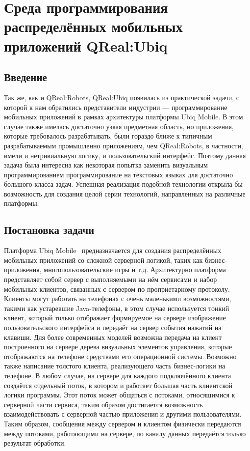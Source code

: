 \section{Среда программирования распределённых мобильных приложений QReal:Ubiq}
\label{chapter:qRealUbiq}

\subsection{Введение}
Так же, как и QReal:Robots, QReal:Ubiq появилась из практической задачи, с которой к нам 
обратились представители индустрии --- программирование мобильных приложений в рамках архитектуры 
платформы Ubiq Mobile. В этом случае также имелась достаточно узкая предметная область, 
но приложения, которые требовалось разрабатывать, были гораздо ближе к типичным разрабатываемым 
промышленно приложениям, чем QReal:Robots, в частности, имели и нетривиальную логику, и 
пользовательский интерфейс. Поэтому данная задача была интересна как некоторая попытка 
заменить визуальным программированием программирование на текстовых языках для достаточно 
большого класса задач. Успешная реализация подобной технологии открыла бы возможность 
для создания целой серии технологий, направленных на различные платформы.

\subsection{Постановка задачи}
Платформа Ubiq Mobile~\cite{onossovski2009ubiq} предназначается для создания распределённых мобильных приложений со сложной серверной 
логикой, таких как бизнес-приложения, многопользовательские игры и т.д. Архитектурно 
платформа представляет собой сервер с выполняемыми на нём сервисами и набор мобильных 
клиентов, связанных с сервером по проприетарному протоколу. Клиенты могут работать 
на телефонах с очень маленькими возможностями, такими как устаревшие Java-телефоны, 
в этом случае используется тонкий клиент, который только отображает формируемое на 
сервере изображение пользовательского интерфейса и передаёт на сервер события нажатий 
на клавиши. Для более современных моделей возможна передача на клиент построенного 
на сервере дерева визуальных элементов управления, которые отображаются на телефоне 
средствами его операционной системы. Возможно также написание толстого клиента, реализующего 
часть бизнес-логики на телефоне. В любом случае, на сервере для каждого подключённого 
клиента создаётся отдельный поток, в котором и работает большая часть клиентской логики 
программы. Этот поток может общаться с потоками, относящимися к серверной части сервиса, 
таким образом достигается возможность взаимодействовать с серверной частью приложения и другими 
пользователями. Таким образом, сообщения между сервером и клиентом физически передаются 
между потоками, работающими на сервере, по каналу данных передаётся только результат 
обработки.

